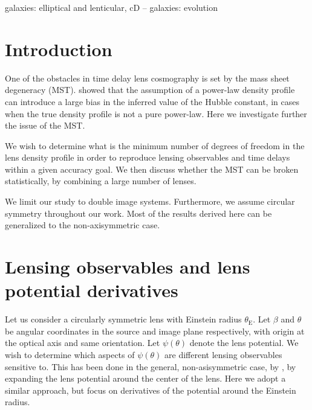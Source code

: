 \documentclass[usenatbib]{mnras}
\def\tein{\theta_{\mathrm{E}}}
\begin{document}
\begin{keywords}
   galaxies: elliptical and lenticular, cD -- galaxies: evolution
\end{keywords}

\section{Introduction}\label{sect:intro}

One of the obstacles in time delay lens cosmography is set by the mass sheet degeneracy (MST).
\citet{S+S13} showed that the assumption of a power-law density profile can introduce a large bias in the inferred value of the Hubble constant, in cases when the true density profile is not a pure power-law.
Here we investigate further the issue of the MST.

We wish to determine what is the minimum number of degrees of freedom in the lens density profile in order to reproduce lensing observables and time delays within a given accuracy goal.
We then discuss whether the MST can be broken statistically, by combining a large number of lenses.

We limit our study to double image systems. Furthermore, we assume circular symmetry throughout our work. Most of the results derived here can be generalized to the non-axisymmetric case.

\section{Lensing observables and lens potential derivatives}\label{sect:pot}

Let us consider a circularly symmetric lens with Einstein radius $\tein$.
Let $\beta$ and $\theta$ be angular coordinates in the source and image plane respectively, with origin at the optical axis and same orientation.
Let $\psi(\theta)$ denote the lens potential.
We wish to determine which aspects of $\psi(\theta)$ are different lensing observables sensitive to.
This has been done in the general, non-asisymmetric case, by \cite{W+B16}, by expanding the lens potential around the center of the lens.
Here we adopt a similar approach, but focus on derivatives of the potential around the Einstein radius.
\end{document}

